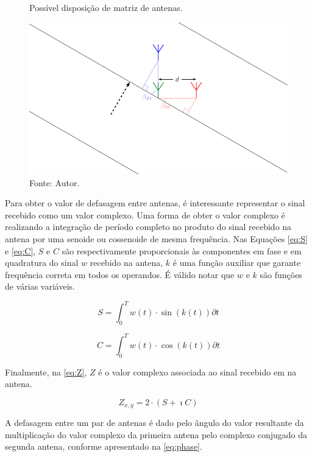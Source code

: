 \begin{figure}[htbp]
    \centering
    \caption{Possível disposição de matriz de antenas.}
    \includegraphics{../pictures/AoA_5.pdf}
    \caption*{Fonte: Autor.}
    \label{fig:AoA_5}
\end{figure}

Para obter o valor de defasagem entre antenas, é interessante representar o sinal recebido como um valor complexo.
Uma forma de obter o valor complexo é realizando a integração de período completo no produto do sinal recebido na antena por uma senoide ou cossenoide de mesma frequência.
Nas Equações \ref{eq:S} e \ref{eq:C}, $S$ e $C$ são respectivamente proporcionais às componentes em fase e em quadratura do sinal $w$ recebido na antena, $k$ é uma função auxiliar que garante frequência correta em todos os operandos.
É válido notar que $w$ e $k$ são funções de várias variáveis.

\begin{equation}\label{eq:S}
    S = \int_0^T w(t) \cdot \sin(k(t)) \partial t
\end{equation}

\begin{equation}\label{eq:C}
    C = \int_0^T w(t) \cdot \cos(k(t)) \partial t
\end{equation}

Finalmente, na \autoref{eq:Z}, $Z$ é o valor complexo associada ao sinal recebido em na antena.

\begin{equation}\label{eq:Z}
    Z_{x,y} = 2\cdot(S + \imath C)
\end{equation}

A defasagem entre um par de antenas é dado pelo ângulo do valor resultante da multiplicação do valor complexo da primeira antena pelo complexo conjugado da segunda antena, conforme apresentado na \autoref{eq:phase}.

